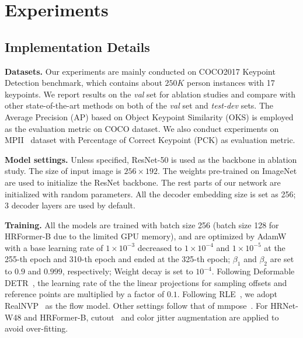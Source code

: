\documentclass[runningheads]{llncs}
\begin{document}
\section{Experiments}










\subsection{Implementation Details}
\noindent\textbf{Datasets.} 
Our experiments are mainly conducted on COCO2017 Keypoint Detection\cite{wang2018mscoco} benchmark, which contains about $250K$ person instances with 17 keypoints. 
We report results on the \emph{val} set for ablation studies and compare with other state-of-the-art methods on both of the \emph{val} set and \emph{test-dev} sets. The Average Precision (AP) based on Object Keypoint Similarity (OKS) is employed as the evaluation metric on COCO dataset. We also conduct experiments on MPII~\cite{mpii} dataset with Percentage of Correct Keypoint (PCK) as evaluation metric.



\noindent\textbf{Model settings.} 
Unless specified, ResNet-50\cite{he2016deep} is used as the backbone in ablation study. 
The size of input image is $256\times192$.
The weights pre-trained on ImageNet\cite{deng2009imagenet} are used to initialize the ResNet backbone. The rest parts of our network are initialized with random parameters. All the decoder embedding size is set as 256; 3 decoder layers are used by default.


\noindent\textbf{Training.}  All the models are trained with batch size 256 (batch size 128 for HRFormer-B due to the limited GPU memory), and are optimized by AdamW\cite{loshchilov2017decoupled} with a base learning rate of $1\times10^{-3}$ decreased to $1\times10^{-4}$ and $1\times10^{-5}$ at the 255-th epoch and 310-th epoch and ended at the 325-th epoch; 
$\beta_1$ and $\beta_2$ are set to $0.9$ and $0.999$, respectively;
Weight decay is set to $10^{-4}$. 
Following Deformable DETR~\cite{zhu2020deformable}, the learning rate of the the linear projections for sampling offsets and reference points are multiplied by a factor of $0.1$. Following RLE~\cite{li2021rle}, we adopt RealNVP~\cite{realnvp} as the flow model. Other settings follow that of mmpose~\cite{mmpose2020}. For HRNet-W48 and HRFormer-B, cutout~\cite{devries2017improved} and color jitter augmentation are applied to avoid over-fitting.
\end{document}
